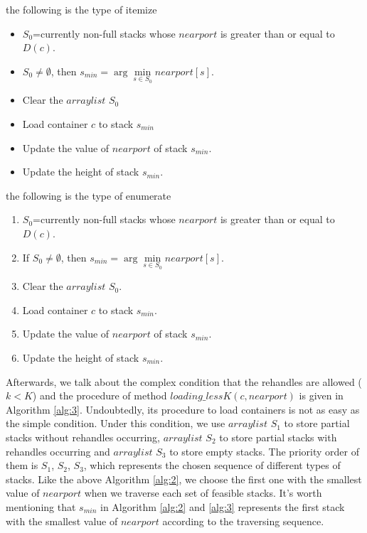 \documentclass[review,3p,times,authoryear,12pt]{elsarticle}
\begin{document}
the following is the type of itemize

\begin{itemize}
\item $S_0$=currently non-full stacks whose $nearport$ is greater than or equal to $D(c)$.
\item \If $S_0 \neq \emptyset$, then $s_{min}=\arg\min \limits_{s\in S_0} nearport[s]$.
\item Clear the $arraylist$ $S_0$
\item Load container $c$ to stack $s_{min}$
\item Update the value of $nearport$ of stack $s_{min}$.
\item Update the height of stack $s_{min}$.
\end{itemize}

the following is the type of enumerate

\begin{enumerate}[step 1]
\item $S_0$=currently non-full stacks whose $nearport$ is greater than or equal to $D(c)$.
\item If $S_0 \neq \emptyset$, then $s_{min}=\arg\min \limits_{s\in S_0} nearport[s]$.
\item Clear the $arraylist$ $S_0$.
\item Load container $c$ to stack $s_{min}$.
\item Update the value of $nearport$ of stack $s_{min}$.
\item Update the height of stack $s_{min}$.
\end{enumerate}



Afterwards, we talk about the complex condition that the rehandles are allowed ($k<K$) and the procedure of method $loading\_lessK(c,nearport)$ is given in Algorithm \ref{alg:3}.
Undoubtedly, its procedure to load containers is not as easy as the simple condition.
Under this condition, we use $arraylist$ $S_1$ to store partial stacks without rehandles occurring, $arraylist$ $S_2$ to store partial stacks with rehandles occurring and $arraylist$ $S_3$ to store empty stacks.
The priority order of them is $S_1$, $S_2$, $S_3$, which represents the chosen sequence of different types of stacks.
Like the above Algorithm \ref{alg:2}, we choose the first one with the smallest value of $nearport$ when we traverse each set of feasible stacks.
It's worth mentioning that $s_{min}$ in Algorithm \ref{alg:2} and \ref{alg:3} represents the first stack with the smallest value of $nearport$ according to the traversing sequence.
\end{document}
